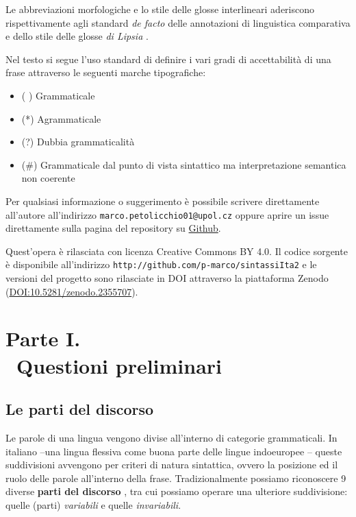 \documentclass[a4paper,twoside,11pt,chapterprefix=false,bibliography=totocnumbered,listof=flat]{scrbook}
\providecommand{\tightlist}{%
  \setlength{\itemsep}{0pt}\setlength{\parskip}{0pt}}
\begin{document}
Le abbreviazioni morfologiche e lo stile delle glosse interlineari
aderiscono rispettivamente agli standard \emph{de facto} delle
annotazioni di linguistica comparativa
\citep[\href{http://www.oxfordhandbooks.com/view/10.1093/oxfordhb/9780199549368.001.0001/oxfordhb-9780199549368}{consultabile
online}]{boeckxListOfAbbreviations} e dello stile delle glosse \emph{di
Lipsia} \citep{leipzigGlossingRules}.

Nel testo si segue l'uso standard di definire i vari gradi di
accettabilità di una frase attraverso le seguenti marche tipografiche:

\begin{itemize}
\tightlist
\item
  ( ) Grammaticale
\item
  (*) Agrammaticale
\item
  (?) Dubbia grammaticalità
\item
  (\#) Grammaticale dal punto di vista sintattico ma interpretazione
  semantica non coerente
\end{itemize}

Per qualsiasi informazione o suggerimento è possibile scrivere
direttamente all'autore all'indirizzo
\texttt{marco.petolicchio01@upol.cz} oppure aprire un issue direttamente
sulla pagina del repository su
\href{http://github.com/p-marco/sintassiIta2}{Github}.

Quest'opera è rilasciata con licenza Creative Commons BY 4.0. Il codice
sorgente è disponibile all'indirizzo
\texttt{http://github.com/p-marco/sintassiIta2} e le versioni del
progetto sono rilasciate in DOI attraverso la piattaforma Zenodo
(\url{DOI:10.5281/zenodo.2355707}).

\mainmatter

\part*{Parte I. \\\ Questioni preliminari}

\hypertarget{le-parti-del-discorso}{%
\chapter{Le parti del discorso}\label{le-parti-del-discorso}}

Le parole di una lingua vengono divise all'interno di categorie
grammaticali. In italiano --una lingua flessiva come buona parte delle
lingue indoeuropee \citep{graffiScalise2009}-- queste suddivisioni
avvengono per criteri di natura sintattica, ovvero la posizione ed il
ruolo delle parole all'interno della frase. Tradizionalmente possiamo
riconoscere 9 diverse \textbf{parti del discorso} \citep{salvi2013}, tra
cui possiamo operare una ulteriore suddivisione: quelle (parti)
\emph{variabili} e quelle \emph{invariabili}.
\end{document}
